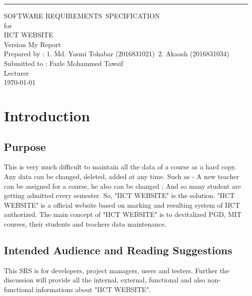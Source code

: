 \documentclass{scrreprt}
\date{}
\def\myversion{My Report}
\begin{document}
    
    \begin{flushright}
        \rule{16cm}{5pt}\vskip1cm
        \begin{bfseries}
            \Huge{SOFTWARE REQUIREMENTS\ SPECIFICATION}\
            \vspace{1.5cm} 
            \\for\\
            \vspace{1.5cm}
            IICT WEBSITE\\
            \vspace{1.5cm}
            \LARGE{Version \myversion}\\
            \vspace{1.5cm}
            Prepared by : 1. Md. Yasmi Tohabar (2016831021)\
            2. Akaash (2016831034)\\
            \vspace{1.5cm}
            Submitted to : Fazle Mohammed Tawsif \\Lecturer\\
            \vspace{1.5cm}
            \today\
        \end{bfseries}
    \end{flushright}
    
    
    \tableofcontents
    
    \chapter{Introduction}
    
    \section{Purpose}
    This is very much difficult to maintain all the data of a course as a hard copy. Any data can be changed, deleted, added at any time. Such as - A new teacher can be assigned for a course, he also can be changed ; And so many student are getting admitted every semester. So, "IICT WEBSITE" is the solution. "IICT WEBSITE" is a official website based on marking and resulting system of IICT authorized. The main concept of "IICT WEBSITE" is to devitalized PGD, MIT courses, their students and teachers data maintenance. 
    \section{Intended Audience and Reading Suggestions}
    This SRS is for developers, project managers, users and testers. Further the discussion will provide all the internal, external, functional and also non-functional informations about "IICT WEBSITE".
    
\end{document}

